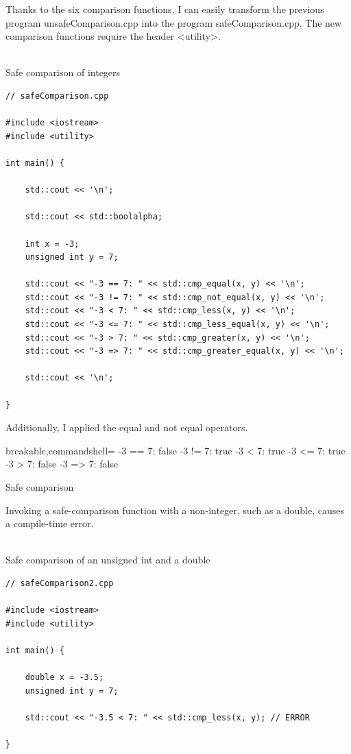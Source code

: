Thanks to the six comparison functions, I can easily transform the previous program unsafeComparison.cpp into the program safeComparison.cpp. The new comparison functions require the header <utility>.

\hspace*{\fill} \\ %
\noindent
Safe comparison of integers
\begin{lstlisting}[style=styleCXX]
// safeComparison.cpp

#include <iostream>
#include <utility>

int main() {
	
	std::cout << '\n';
	
	std::cout << std::boolalpha;
	
	int x = -3;
	unsigned int y = 7;
	
	std::cout << "-3 == 7: " << std::cmp_equal(x, y) << '\n';
	std::cout << "-3 != 7: " << std::cmp_not_equal(x, y) << '\n';
	std::cout << "-3 < 7: " << std::cmp_less(x, y) << '\n';
	std::cout << "-3 <= 7: " << std::cmp_less_equal(x, y) << '\n';
	std::cout << "-3 > 7: " << std::cmp_greater(x, y) << '\n';
	std::cout << "-3 => 7: " << std::cmp_greater_equal(x, y) << '\n';
	
	std::cout << '\n';
	
}
\end{lstlisting}

Additionally, I applied the equal and not equal operators.

\begin{tcblisting}{breakable,commandshell={}}
-3 == 7: false
-3 != 7: true
-3 < 7: true
-3 <= 7: true
-3 > 7: false
-3 => 7: false
\end{tcblisting}

\begin{center}
Safe comparison
\end{center}

Invoking a safe-comparison function with a non-integer, such as a double, causes a compile-time error.

\hspace*{\fill} \\ %
\noindent
Safe comparison of an unsigned int and a double
\begin{lstlisting}[style=styleCXX]
// safeComparison2.cpp

#include <iostream>
#include <utility>

int main() {
	
	double x = -3.5;
	unsigned int y = 7;
	
	std::cout << "-3.5 < 7: " << std::cmp_less(x, y); // ERROR
	
}
\end{lstlisting}

